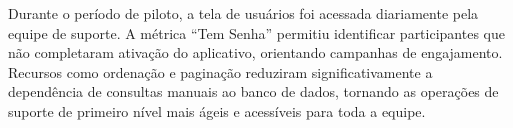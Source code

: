 Durante o período de piloto, a
tela de usuários foi acessada diariamente pela equipe de suporte.
A métrica ``Tem Senha'' permitiu identificar participantes que não completaram ativação do aplicativo, 
orientando campanhas de engajamento. Recursos como ordenação e paginação reduziram significativamente a 
dependência de consultas manuais ao banco de dados, tornando as operações de suporte de primeiro nível mais ágeis
e acessíveis para toda a equipe.
